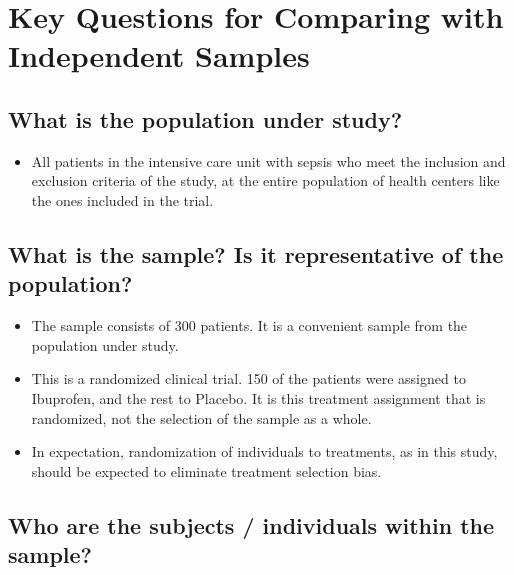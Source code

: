 \documentclass[
]{book}
\providecommand{\tightlist}{%
  \setlength{\itemsep}{0pt}\setlength{\parskip}{0pt}}
\begin{document}
\hypertarget{key-questions-for-comparing-with-independent-samples}{%
\section{Key Questions for Comparing with Independent Samples}\label{key-questions-for-comparing-with-independent-samples}}

\hypertarget{what-is-the-population-under-study}{%
\subsection{\texorpdfstring{What is the \textbf{population} under study?}{What is the population under study?}}\label{what-is-the-population-under-study}}

\begin{itemize}
\tightlist
\item
  All patients in the intensive care unit with sepsis who meet the inclusion and exclusion criteria of the study, at the entire population of health centers like the ones included in the trial.
\end{itemize}

\hypertarget{what-is-the-sample-is-it-representative-of-the-population}{%
\subsection{\texorpdfstring{What is the \textbf{sample}? Is it representative of the population?}{What is the sample? Is it representative of the population?}}\label{what-is-the-sample-is-it-representative-of-the-population}}

\begin{itemize}
\tightlist
\item
  The sample consists of 300 patients. It is a convenient sample from the population under study.
\item
  This is a randomized clinical trial. 150 of the patients were assigned to Ibuprofen, and the rest to Placebo. It is this treatment assignment that is randomized, not the selection of the sample as a whole.
\item
  In expectation, randomization of individuals to treatments, as in this study, should be expected to eliminate treatment selection bias.
\end{itemize}

\hypertarget{who-are-the-subjects-individuals-within-the-sample}{%
\subsection{\texorpdfstring{Who are the subjects / \textbf{individuals} within the sample?}{Who are the subjects / individuals within the sample?}}\label{who-are-the-subjects-individuals-within-the-sample}}
\end{document}
